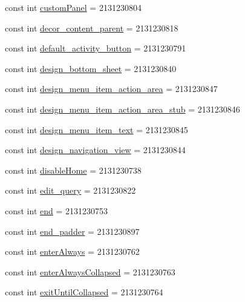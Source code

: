\begin{CompactItemize}
const int \hyperlink{class__2doo_1_1_droid_1_1_resource_1_1_id_90d57731f0ac2bda08d5e111505ee038}{customPanel} = 2131230804
\item 
const int \hyperlink{class__2doo_1_1_droid_1_1_resource_1_1_id_dd446edeb1890d0906af3bd8c53072fe}{decor\_\-content\_\-parent} = 2131230818
\item 
const int \hyperlink{class__2doo_1_1_droid_1_1_resource_1_1_id_8c9a9660545ebf4644634126f147b421}{default\_\-activity\_\-button} = 2131230791
\item 
const int \hyperlink{class__2doo_1_1_droid_1_1_resource_1_1_id_900556784946a5c06f81fe9d9ee95752}{design\_\-bottom\_\-sheet} = 2131230840
\item 
const int \hyperlink{class__2doo_1_1_droid_1_1_resource_1_1_id_98637190fea89dcbe9fc8bb45901962d}{design\_\-menu\_\-item\_\-action\_\-area} = 2131230847
\item 
const int \hyperlink{class__2doo_1_1_droid_1_1_resource_1_1_id_1557d1bfdff6a80edb347d38d384511a}{design\_\-menu\_\-item\_\-action\_\-area\_\-stub} = 2131230846
\item 
const int \hyperlink{class__2doo_1_1_droid_1_1_resource_1_1_id_023d5fadb3fdb5cf94d2cda935bf6db0}{design\_\-menu\_\-item\_\-text} = 2131230845
\item 
const int \hyperlink{class__2doo_1_1_droid_1_1_resource_1_1_id_78253f90359a2251011f3c63dbaafdc2}{design\_\-navigation\_\-view} = 2131230844
\item 
const int \hyperlink{class__2doo_1_1_droid_1_1_resource_1_1_id_a862f7edab50e0c4ab582b001e5620f3}{disableHome} = 2131230738
\item 
const int \hyperlink{class__2doo_1_1_droid_1_1_resource_1_1_id_6cd6115121bd4e8958670444eb40b641}{edit\_\-query} = 2131230822
\item 
const int \hyperlink{class__2doo_1_1_droid_1_1_resource_1_1_id_70d48f2ab4dac16615dffb12c4e1541b}{end} = 2131230753
\item 
const int \hyperlink{class__2doo_1_1_droid_1_1_resource_1_1_id_5c9107b54882adcda2ba0c13720c8003}{end\_\-padder} = 2131230897
\item 
const int \hyperlink{class__2doo_1_1_droid_1_1_resource_1_1_id_0aabbc1bee16bccae2fc6e20118e0d28}{enterAlways} = 2131230762
\item 
const int \hyperlink{class__2doo_1_1_droid_1_1_resource_1_1_id_b97c0a7c634db7b2404810f666affb6d}{enterAlwaysCollapsed} = 2131230763
\item 
const int \hyperlink{class__2doo_1_1_droid_1_1_resource_1_1_id_6b7734683029016245a2302180a48b6b}{exitUntilCollapsed} = 2131230764

\end{CompactItemize}
